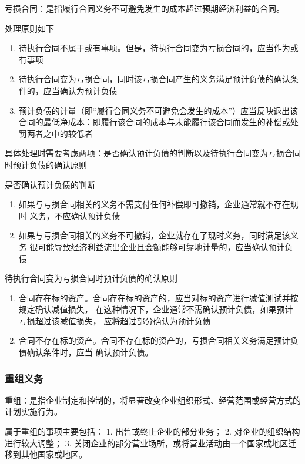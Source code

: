 \documentclass[UTF8,12pt]{ctexart}
\numberwithin{equation}{section} %
\numberwithin{figure}{section}
\numberwithin{table}{section}
\begin{document}
	亏损合同：是指履行合同义务不可避免发生的成本超过预期经济利益的合同。
	
	处理原则如下
	\begin{enumerate}
		\item 待执行合同不属于或有事项。但是，待执行合同变为亏损合同的，应当作为或有事项
		
		\item 待执行合同变为亏损合同，同时该亏损合同产生的义务满足预计负债的确认条件的，应当确认为预计负债
		
		\item 预计负债的计量（即“履行合同义务不可避免会发生的成本”）应当反映退出该合同的最低净成本：即履行该合同的成本与未能履行该合同而发生的补偿或处罚两者之中的较低者
	\end{enumerate}

	具体处理时需要考虑两项：是否确认预计负债的判断以及待执行合同变为亏损合同时预计负债的确认原则
	
	是否确认预计负债的判断
	\begin{enumerate}
		\item 如果与亏损合同相关的义务不需支付任何补偿即可撤销，企业通常就不存在现时  义务，不应确认预计负债
		
		\item 如果与亏损合同相关的义务不可撤销，企业就存在了现时义务，同时满足该义务  很可能导致经济利益流出企业且金额能够可靠地计量的，应当确认预计负债
	\end{enumerate}
	
	待执行合同变为亏损合同时预计负债的确认原则
	\begin{enumerate}
		\item 合同存在标的资产。合同存在标的资产的，应当对标的资产进行减值测试并按规定确认减值损失，  在这种情况下，企业通常不需确认预计负债，如果预计亏损超过该减值损失，  应将超过部分确认为预计负债
		
		\item 合同不存在标的资产。合同不存在标的资产的，亏损合同相关义务满足预计负债确认条件时，应当  确认预计负债。
	\end{enumerate}
	
	\subsubsection{重组义务}
	重组：是指企业制定和控制的，将显著改变企业组织形式、经营范围或经营方式的计划实施行为。
	
	属于重组的事项主要包括：
	1.	出售或终止企业的部分业务；
	2.	对企业的组织结构进行较大调整；
	3.	关闭企业的部分营业场所，或将营业活动由一个国家或地区迁移到其他国家或地区。
	
\end{document}
